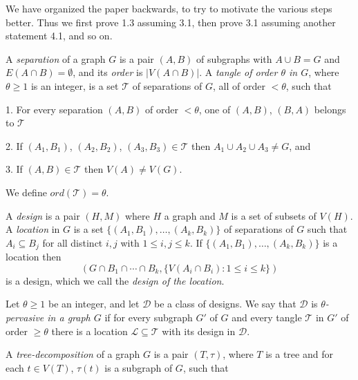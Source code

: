 We have organized the paper backwards, to try to motivate the various steps better. Thus we first prove 1.3 assuming 3.1, then prove 3.1 assuming another statement 4.1, and so on.


A \textit{separation} of a graph $G$ is a pair $(A, B)$ of subgraphs with $A \cup B = G$ and $E(A \cap B) = \emptyset$, and its \textit{order} is $|V(A \cap B)|$. A \textit{tangle of order $\theta$ in $G$}, where $\theta \ge 1$ is an integer, is a set $\mathscr{T}$ of separations of $G$, all of order $<\theta$, such that

\hspace*{12pt}1. For every separation $(A, B)$ of order $<\theta$, one of $(A, B)$, $(B, A)$ belongs to $\mathscr{T}$

\hspace*{12pt}2. If $(A_1, B_1)$, $(A_2, B_2)$, $(A_3, B_3) \in \mathscr{T}$ then $A_1 \cup A_2 \cup A_3 \ne G$, and

\hspace*{12pt}3. If $(A, B) \in \mathscr{T}$ then $V(A) \ne V(G)$.

We define $ord(\mathscr{T}) = \theta$.

A \textit{design} is a pair $(H, M)$ where $H$   a graph and $M$ is a set of subsets of $V(H)$. A \textit{location} in $G$ is a set $\{(A_1, B_1), \ldots, (A_k, B_k)\}$ of separations of $G$ such that $A_i \subseteq B_j$ for all distinct $i, j$ with $1 \le i, j \le k$. If $\{(A_1, B_1), \ldots, (A_k, B_k)\}$ is a location then
\begin{equation*}
(G \cap B_1 \cap \cdots \cap B_k, \{V(A_i \cap B_i) \colon 1 \le i \le k\})
\end{equation*}
is a design, which we call the \textit{design of the location}.

Let $\theta \ge 1$ be an integer, and let $\mathscr{D}$ be a class of designs. We say that $\mathscr{D}$ is \textit{$\theta$-pervasive in a graph $G$} if for every subgraph $G'$ of $G$ and every tangle $\mathscr{T}$ in $G'$ of order $\ge \theta$ there is a location $\mathscr{L} \subseteq \mathscr{T}$ with its design in $\mathscr{D}$.

A \textit{tree-decomposition} of a graph $G$ is a pair $(T, \tau)$, where $T$ is a tree and for each $t \in V(T)$, $\tau(t)$ is a subgraph of $G$, such that

